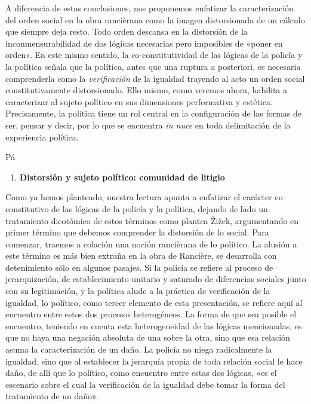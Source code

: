 A diferencia de estas conclusiones, nos proponemos enfatizar la caracterización del orden social en la obra rancièrana como la imagen distorsionada de un cálculo que siempre deja resto. Todo orden descansa en la distorsión de la inconmensurabilidad de dos lógicas necesarias pero imposibles de «poner en orden». En este mismo sentido, la co-constitutividad de las lógicas de la policía y la política señala que la política, antes que una ruptura a posteriori, es necesaria comprenderla como la \emph{verificación} de la igualdad trayendo al acto un orden social constitutivamente distorsionado. Ello mismo, como veremos ahora, habilita a caracterizar al sujeto político en sus dimensiones performativa y estética. Precisamente, la política tiene un rol central en la configuración de las formas de ser, pensar y decir, por lo que se encuentra \emph{in nuce} en toda delimitación de la experiencia política.

Pá

\begin{enumerate}
\def\labelenumi{\arabic{enumi}.}
\item
  \textbf{Distorsión y sujeto político: comunidad de litigio}
\end{enumerate}

Como ya hemos planteado, nuestra lectura apunta a enfatizar el carácter co constitutivo de las lógicas de la policía y la política, dejando de lado un tratamiento dicotómico de estos términos como plantea Žižek, argumentando en primer término que debemos comprender la distorsión de lo social. Para comenzar, traemos a colación una noción rancièrana de lo político. La alusión a este término es más bien extraña en la obra de Rancière, se desarrolla con detenimiento sólo en algunos pasajes. Si la policía se refiere al proceso de jerarquización, de establecimiento unitario y saturado de diferencias sociales junto con su legitimación, y la política alude a la práctica de verificación de la igualdad, lo político, como tercer elemento de esta presentación, se refiere aquí al encuentro entre estos dos procesos heterogéneos. La forma de que sea posible el encuentro, teniendo en cuenta esta heterogeneidad de las lógicas mencionadas, es que no haya una negación absoluta de una sobre la otra, sino que esa relación asuma la caracterización de un daño. La policía no niega radicalmente la igualdad, sino que al establecer la jerarquía propia de toda relación social le hace daño, de allí que lo político, como encuentro entre estas dos lógicas, «es el escenario sobre el cual la verificación de la igualdad debe tomar la forma del tratamiento de un daño».

